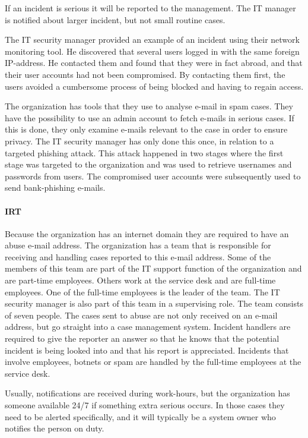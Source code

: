 \documentclass[b5paper, twoside, openright, 11pt]{report}
\begin{document}
If an incident is serious it will be reported to the management. The IT manager is notified about larger incident, but not small routine cases.

The IT security manager provided an example of an incident using their network monitoring tool. He discovered that several users logged in with the same foreign IP-address. He contacted them and found that they were in fact abroad, and that their user accounts had not been compromised. By contacting them first, the users avoided a cumbersome process of being blocked and having to regain access. 

The organization has tools that they use to analyse e-mail in spam cases. They have the possibility to use an admin account to fetch e-mails in serious cases. If this is done, they only examine e-mails relevant to the case in order to ensure privacy. The IT security manager has only done this once, in relation to a targeted phishing attack. This attack happened in two stages where the first stage was targeted to the organization and was used to retrieve usernames and passwords from users. The compromised user accounts were subsequently used to send bank-phishing e-mails.

\paragraph{\acl{IRT}}
Because the organization has an internet domain they are required to have an abuse e-mail address. The organization has a team that is responsible for receiving and handling cases reported to this e-mail address. Some of the members of this team are part of the IT support function of the organization and are part-time employees. Others work at the service desk and are full-time employees. One of the full-time employees is the leader of the team. The IT security manager is also part of this team in a supervising role. The team consists of seven people. The cases sent to abuse are not only received on an e-mail address, but go straight into a case management system. Incident handlers are required to give the reporter an answer so that he knows that the potential incident is being looked into and that his report is appreciated. Incidents that involve employees, botnets or spam are handled by the full-time employees at the service desk.

Usually, notifications are received during work-hours, but the organization has someone available 24/7 if something extra serious occurs. In those cases they need to be alerted specifically, and it will typically be a system owner who notifies the person on duty.
\end{document}
